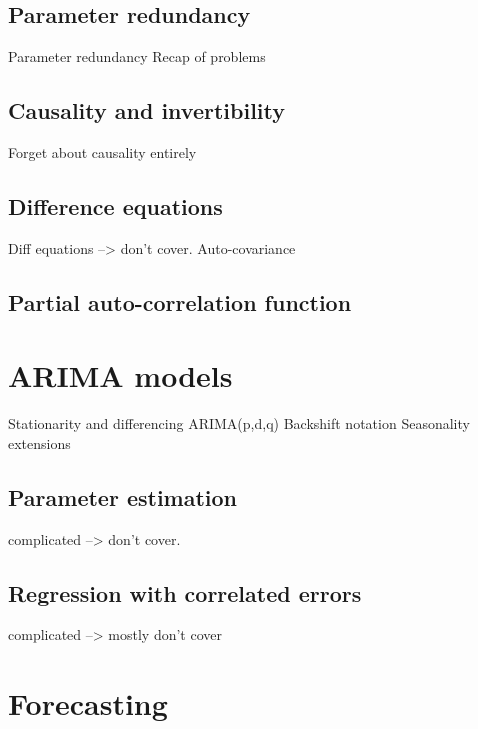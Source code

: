 \documentclass{article}
\begin{document}
\subsection{Parameter redundancy}

Parameter redundancy
Recap of problems

\subsection{Causality and invertibility}

Forget about causality entirely

\subsection{Difference equations}

Diff equations --> don't cover.
Auto-covariance

\subsection{Partial auto-correlation function}

\section{ARIMA models}

Stationarity and differencing
ARIMA(p,d,q)
Backshift notation
Seasonality extensions

\subsection{Parameter estimation}

complicated --> don't cover.

\subsection{Regression with correlated errors}

complicated --> mostly don't cover

\section{Forecasting}
\end{document}
